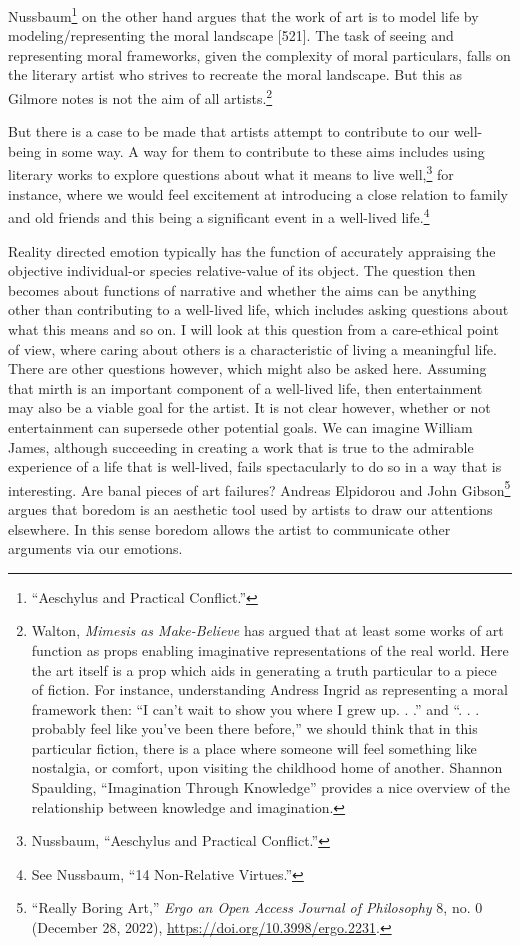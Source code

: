 \documentclass[phdthesis,12pt,final,a4paper]{wuthesis}
\theoremstyle{definition}
\theoremstyle{definition}
\theoremstyle{definition}
\theoremstyle{definition}
\theoremstyle{remark}
\begin{document}
Nussbaum\footnote{{``Aeschylus and Practical Conflict.''}} on the other hand argues that the work of art is to model life by modeling/representing the moral landscape {[}521{]}. The task of seeing and representing moral frameworks, given the complexity of moral particulars, falls on the literary artist who strives to recreate the moral landscape. But this as Gilmore notes is not the aim of all artists.\footnote{Walton, \emph{Mimesis as {Make-Believe}} has argued that at least some works of art function as props enabling imaginative representations of the real world. Here the art itself is a prop which aids in generating a truth particular to a piece of fiction. For instance, understanding Andress Ingrid as representing a moral framework then: ``I can't wait to show you where I grew up. . .'' and ``. . . probably feel like you've been there before,'' we should think that in this particular fiction, there is a place where someone will feel something like nostalgia, or comfort, upon visiting the childhood home of another. Shannon Spaulding, {``Imagination {Through Knowledge}''} provides a nice overview of the relationship between knowledge and imagination.}

But there is a case to be made that artists attempt to contribute to our well-being in some way. A way for them to contribute to these aims includes using literary works to explore questions about what it means to live well,\footnote{Nussbaum, {``Aeschylus and Practical Conflict.''}} for instance, where we would feel excitement at introducing a close relation to family and old friends and this being a significant event in a well-lived life.\footnote{See Nussbaum, {``14 {Non-Relative Virtues}.''}}

Reality directed emotion typically has the function of accurately appraising the objective individual-or species relative-value of its object. The question then becomes about functions of narrative and whether the aims can be anything other than contributing to a well-lived life, which includes asking questions about what this means and so on. I will look at this question from a care-ethical point of view, where caring about others is a characteristic of living a meaningful life. There are other questions however, which might also be asked here. Assuming that mirth is an important component of a well-lived life, then entertainment may also be a viable goal for the artist. It is not clear however, whether or not entertainment can supersede other potential goals. We can imagine William James, although succeeding in creating a work that is true to the admirable experience of a life that is well-lived, fails spectacularly to do so in a way that is interesting. Are banal pieces of art failures? Andreas Elpidorou and John Gibson\footnote{{``Really {Boring Art},''} \emph{Ergo an Open Access Journal of Philosophy} 8, no. 0 (December 28, 2022), \url{https://doi.org/10.3998/ergo.2231}.} argues that boredom is an aesthetic tool used by artists to draw our attentions elsewhere. In this sense boredom allows the artist to communicate other arguments via our emotions.
\end{document}

